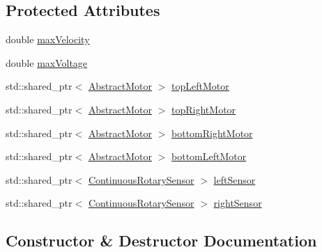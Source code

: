 \subsection*{Protected Attributes}
\begin{DoxyCompactItemize}
\item 
double \mbox{\hyperlink{classokapi_1_1XDriveModel_ac260aafdba066b0a6b5af9bcef85558a}{max\+Velocity}}
\item 
double \mbox{\hyperlink{classokapi_1_1XDriveModel_a30569bcd27d696b44836f32d62688809}{max\+Voltage}}
\item 
std\+::shared\+\_\+ptr$<$ \mbox{\hyperlink{classokapi_1_1AbstractMotor}{Abstract\+Motor}} $>$ \mbox{\hyperlink{classokapi_1_1XDriveModel_a7fd97da22c4f052efd49e7c7554409aa}{top\+Left\+Motor}}
\item 
std\+::shared\+\_\+ptr$<$ \mbox{\hyperlink{classokapi_1_1AbstractMotor}{Abstract\+Motor}} $>$ \mbox{\hyperlink{classokapi_1_1XDriveModel_abe393384e83737181b5b836d99b0a480}{top\+Right\+Motor}}
\item 
std\+::shared\+\_\+ptr$<$ \mbox{\hyperlink{classokapi_1_1AbstractMotor}{Abstract\+Motor}} $>$ \mbox{\hyperlink{classokapi_1_1XDriveModel_a43ba3ac3a9750895b2bfd5b8c121ca7e}{bottom\+Right\+Motor}}
\item 
std\+::shared\+\_\+ptr$<$ \mbox{\hyperlink{classokapi_1_1AbstractMotor}{Abstract\+Motor}} $>$ \mbox{\hyperlink{classokapi_1_1XDriveModel_ac4c184a14b3431a1dda1136ca1133400}{bottom\+Left\+Motor}}
\item 
std\+::shared\+\_\+ptr$<$ \mbox{\hyperlink{classokapi_1_1ContinuousRotarySensor}{Continuous\+Rotary\+Sensor}} $>$ \mbox{\hyperlink{classokapi_1_1XDriveModel_a16ef5d576e9b819d79b6762e706906c5}{left\+Sensor}}
\item 
std\+::shared\+\_\+ptr$<$ \mbox{\hyperlink{classokapi_1_1ContinuousRotarySensor}{Continuous\+Rotary\+Sensor}} $>$ \mbox{\hyperlink{classokapi_1_1XDriveModel_ab50a3276501ce448d46415361f8a422f}{right\+Sensor}}
\end{DoxyCompactItemize}


\subsection{Constructor \& Destructor Documentation}
\mbox{\label{classokapi_1_1XDriveModel_a037b5cd463b8798b86e8bd9aa1098711}} 
